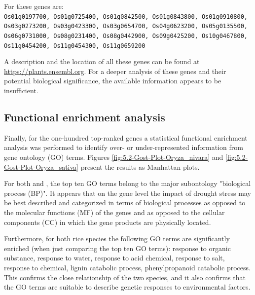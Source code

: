 For  these genes are:\\
{\scriptsize\texttt{Os01g0197700, Os01g0725400, Os01g0842500, Os01g0843800, Os01g0910800, Os03g0273200, Os03g0423300, Os03g0654700, Os04g0623200, Os05g0135500, Os06g0731000, Os08g0231400, Os08g0442900, Os09g0425200, Os10g0467800, Os11g0454200, Os11g0454300, Os11g0659200
}}

A description and the location of all these genes can be found at \url{https://plants.ensembl.org}. For a deeper analysis of these genes and their potential biological significance, the available information appears to be insufficient.


\subsection{Functional enrichment analysis}

Finally, for the one-hundred top-ranked genes a statistical functional enrichment analysis was performed to identify over- or under-represented information from gene ontology (GO) terms. Figures \ref{fig:5.2-Gost-Plot-Oryza_nivara} and \ref{fig:5.2-Gost-Plot-Oryza_sativa} present the results as Manhattan plots.

For both  and , the top ten GO terms belong to the major subontology "biological process (BP)". It appears that on the gene level the impact of drought stress may be best described and categorized in terms of biological processes as opposed to the molecular functions (MF) of the genes and as opposed to the cellular components (CC) in which the gene products are physically located.

Furthermore, for both rice species the following GO terms are significantly enriched (when just comparing the top ten GO terms): response to organic substance, response to water, response to acid chemical, response to salt, response to chemical, lignin catabolic process, phenylpropanoid catabolic process. This confirms the close relationship of the two species, and it also confirms that the GO terms are suitable to describe genetic responses to environmental factors.


